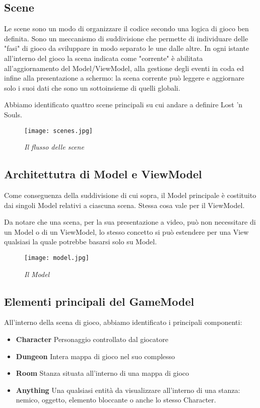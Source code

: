 \subsection{Scene}
Le scene sono un modo di organizzare il codice secondo una logica di gioco ben definita. Sono un meccanismo di suddivisione che permette di individuare delle "fasi" di gioco da sviluppare in modo separato le une dalle altre.
In ogni istante all'interno del gioco la scena indicata come "corrente" è abilitata all'aggiornamento del Model/ViewModel, alla gestione degli eventi in coda ed infine alla presentazione a schermo: la scena corrente può leggere e aggiornare solo i suoi dati che sono un sottoinsieme di quelli globali. 

Abbiamo identificato quattro scene principali su cui andare a definire Lost 'n Souls. 

\begin{figure}[!hbt]
    \centering
    \texttt{[image: scenes.jpg]}
    \caption{\textit{Il flusso delle scene}}
\end{figure}

\subsection{Architettutra di Model e ViewModel}

Come conseguenza della suddivisione di cui sopra, il Model principale è costituito dai singoli Model relativi a ciascuna scena. Stessa cosa vale per il ViewModel. 

Da notare che una scena, per la sua presentazione a video, può non necessitare di un Model o di un ViewModel, lo stesso concetto si può estendere per una View qualsiasi la quale potrebbe basarsi solo su Model.

\begin{figure}[!hbt]
    \centering
    \texttt{[image: model.jpg]}
    \caption{\textit{Il Model}} 
\end{figure}

\newpage 
\subsection{Elementi principali del GameModel}
All'interno della scena di gioco, abbiamo identificato i principali componenti:

\begin{itemize}
    \item \textbf{Character} Personaggio controllato dal giocatore
    \item \textbf{Dungeon} Intera mappa di gioco nel suo complesso
    \item \textbf{Room} Stanza situata all'interno di una mappa di gioco
    \item \textbf{Anything} Una qualsiasi entità da visualizzare all'interno di una stanza: nemico, oggetto, elemento bloccante o anche lo stesso Character. 
    
\end{itemize}


